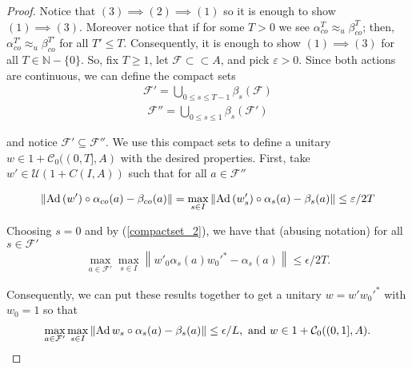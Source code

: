 \documentclass[11pt,a4paper,oneside]{amsart}
\newcommand{\Ad}{{\rm Ad\,}}
\newcommand{\norm}[1]{\left\|#1\right\|} %
\begin{document}
\begin{proof}
Notice that $(3)\implies (2)\implies (1)$ so it is enough to show $(1)\implies (3)$. Moreover notice that if for some $T>0$ we see $\alpha_{co}^T\approx_u \beta_{co}^{T}$; then,  $\alpha_{co}^{T'}\approx_u \beta_{co}^{T'}$ for all $T'\leq T$. Consequently, it is enough to show $(1)\implies (3)$ for all $T\in \mathbb{N}-\{0\}$. So, fix $T\geq 1$, let $\mathcal F\subset \subset A$, and pick $\varepsilon>0$. Since both actions are continuous, we can define the compact sets \begin{align}
\mathcal F'=\bigcup_{0\leq s \leq T-1}\beta_s(\mathcal F)
\end{align} 
\begin{align}
\label{compactset_1}
\mathcal F''=\bigcup_{0\leq s\leq 1}\beta_s(\mathcal F')
\end{align}

and notice $\mathcal F'\subseteq \mathcal F''$. We use this compact sets to define a unitary $w\in 1+\mathcal C_0((0,T], A)$ with the desired properties. First, take $w'\in \mathcal U(1+C(I, A))$ such that for all $a\in \mathcal F''$ 

\begin{align}
\label{compactset_2}
\norm{\Ad (w')\circ \alpha_{co}(a)-\beta_{co}(a)}=\max_{s\in I}\norm{\Ad (w_s')\circ \alpha_s(a)-\beta_s(a)}\leq \varepsilon/{2T} 
\end{align}  

Choosing $s=0$ and by (\ref{compactset_2}), we have that (abusing notation) for all $s\in \mathcal F'$
\begin{align}
\label{compactset_3}
\max_{a\in \mathcal F'}\max_{s\in I}\norm{w'_0\alpha_s(a){w_0'}^{*}-\alpha_s(a)}\leq \epsilon/{2T}. 
\end{align} 

Consequently, we can put these results together to get a unitary $w=w'{w_0'}^*$ with $w_0=1$ so that 
\begin{align}
\label{nicerintertwining}
\max_{a\in \mathcal F'}\max_{s\in I}\norm{\Ad w_s\circ \alpha_s(a)-\beta_s(a)}\leq \epsilon/L, \text{ and } w\in 1+\mathcal C_0((0,1], A).
\end{align}


\end{proof}
\end{document}
